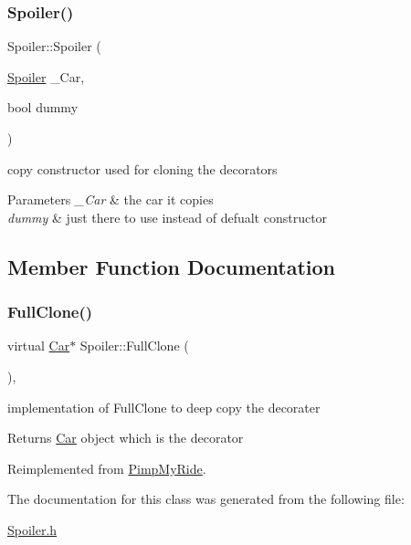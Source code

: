 \subsubsection{\texorpdfstring{Spoiler()}{Spoiler()}\hspace{0.1cm}{\footnotesize\ttfamily [2/2]}}
{\footnotesize\ttfamily Spoiler\+::\+Spoiler (\begin{DoxyParamCaption}\item[{\mbox{\hyperlink{class_spoiler}{Spoiler}}}]{\+\_\+\+Car,  }\item[{bool}]{dummy }\end{DoxyParamCaption})\hspace{0.3cm}{\ttfamily [inline]}}

copy constructor used for cloning the decorators 
\begin{DoxyParams}{Parameters}
{\em \+\_\+\+Car} & the car it copies \\
\hline
{\em dummy} & just there to use instead of defualt constructor \\
\hline
\end{DoxyParams}


\subsection{Member Function Documentation}
\mbox{\label{class_spoiler_a240c57673fae69ffa9cf51468ca17793}} 
\subsubsection{\texorpdfstring{Full\+Clone()}{FullClone()}}
{\footnotesize\ttfamily virtual \mbox{\hyperlink{class_car}{Car}}$\ast$ Spoiler\+::\+Full\+Clone (\begin{DoxyParamCaption}{ }\end{DoxyParamCaption})\hspace{0.3cm}{\ttfamily [inline]}, {\ttfamily [virtual]}}

implementation of Full\+Clone to deep copy the decorater \begin{DoxyReturn}{Returns}
\mbox{\hyperlink{class_car}{Car}} object which is the decorator 
\end{DoxyReturn}


Reimplemented from \mbox{\hyperlink{class_pimp_my_ride_afce12a1a761727eebec707924521d0e2}{Pimp\+My\+Ride}}.



The documentation for this class was generated from the following file\+:\begin{DoxyCompactItemize}
\item 
\mbox{\hyperlink{_spoiler_8h}{Spoiler.\+h}}\end{DoxyCompactItemize}
